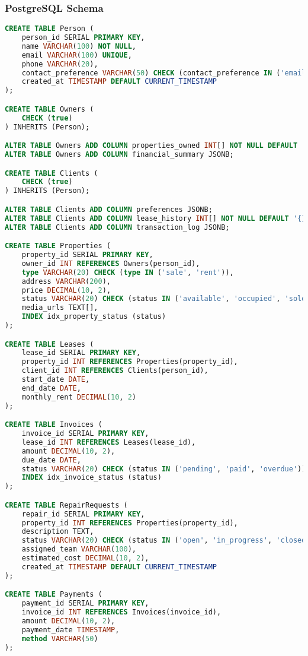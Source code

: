 \documentclass[12pt]{article}
\begin{document}
\subsubsection{PostgreSQL Schema}
\begin{lstlisting}[language=SQL, caption=PostgreSQL Schema]
CREATE TABLE Person (
    person_id SERIAL PRIMARY KEY,
    name VARCHAR(100) NOT NULL,
    email VARCHAR(100) UNIQUE,
    phone VARCHAR(20),
    contact_preference VARCHAR(50) CHECK (contact_preference IN ('email', 'phone', 'both')),
    created_at TIMESTAMP DEFAULT CURRENT_TIMESTAMP
);

CREATE TABLE Owners (
    CHECK (true)
) INHERITS (Person);

ALTER TABLE Owners ADD COLUMN properties_owned INT[] NOT NULL DEFAULT '{}';
ALTER TABLE Owners ADD COLUMN financial_summary JSONB;

CREATE TABLE Clients (
    CHECK (true)
) INHERITS (Person);

ALTER TABLE Clients ADD COLUMN preferences JSONB;
ALTER TABLE Clients ADD COLUMN lease_history INT[] NOT NULL DEFAULT '{}';
ALTER TABLE Clients ADD COLUMN transaction_log JSONB;

CREATE TABLE Properties (
    property_id SERIAL PRIMARY KEY,
    owner_id INT REFERENCES Owners(person_id),
    type VARCHAR(20) CHECK (type IN ('sale', 'rent')),
    address VARCHAR(200),
    price DECIMAL(10, 2),
    status VARCHAR(20) CHECK (status IN ('available', 'occupied', 'sold')),
    media_urls TEXT[],
    INDEX idx_property_status (status)
);

CREATE TABLE Leases (
    lease_id SERIAL PRIMARY KEY,
    property_id INT REFERENCES Properties(property_id),
    client_id INT REFERENCES Clients(person_id),
    start_date DATE,
    end_date DATE,
    monthly_rent DECIMAL(10, 2)
);

CREATE TABLE Invoices (
    invoice_id SERIAL PRIMARY KEY,
    lease_id INT REFERENCES Leases(lease_id),
    amount DECIMAL(10, 2),
    due_date DATE,
    status VARCHAR(20) CHECK (status IN ('pending', 'paid', 'overdue')),
    INDEX idx_invoice_status (status)
);

CREATE TABLE RepairRequests (
    repair_id SERIAL PRIMARY KEY,
    property_id INT REFERENCES Properties(property_id),
    description TEXT,
    status VARCHAR(20) CHECK (status IN ('open', 'in_progress', 'closed')),
    assigned_team VARCHAR(100),
    estimated_cost DECIMAL(10, 2),
    created_at TIMESTAMP DEFAULT CURRENT_TIMESTAMP
);

CREATE TABLE Payments (
    payment_id SERIAL PRIMARY KEY,
    invoice_id INT REFERENCES Invoices(invoice_id),
    amount DECIMAL(10, 2),
    payment_date TIMESTAMP,
    method VARCHAR(50)
);
\end{lstlisting}
\end{document}
